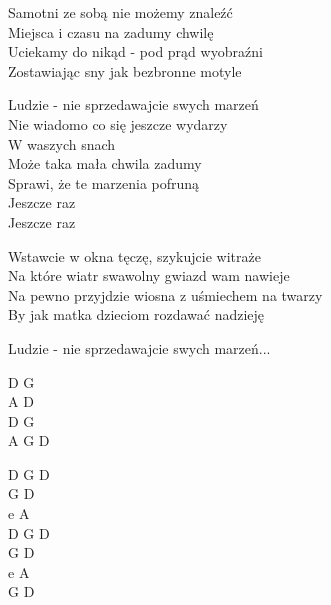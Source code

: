 \begin{text}
Samotni ze sobą nie możemy znaleźć\\
Miejsca i czasu na zadumy chwilę\\
Uciekamy do nikąd - pod prąd wyobraźni\\
Zostawiając sny jak bezbronne motyle

\vin Ludzie - nie sprzedawajcie swych marzeń \\
\vin Nie wiadomo co się jeszcze wydarzy\\
\vin W waszych snach\\
\vin Może taka mała chwila zadumy\\
\vin Sprawi, że te marzenia pofruną\\
\vin Jeszcze raz\\
\vin Jeszcze raz

Wstawcie w okna tęczę, szykujcie witraże\\
Na które wiatr swawolny gwiazd wam nawieje\\
Na pewno przyjdzie wiosna z uśmiechem na twarzy\\
By jak matka dzieciom rozdawać nadzieję

\vin Ludzie - nie sprzedawajcie swych marzeń...

\end{text}
\begin{chord}
D G\\
A D\\
D G\\
A G D

D G D\\
G D\\
e A\\
D G D\\
G D\\
e A\\
G D
\end{chord}